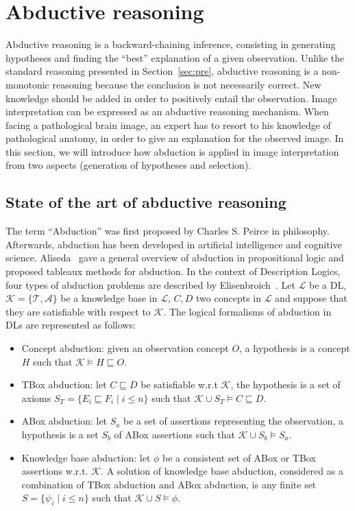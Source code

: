 \documentclass{article}
\begin{document}
\section{Abductive reasoning}\label{sec:abd}
Abductive reasoning is a backward-chaining inference, consisting in generating hypotheses and finding the ``best'' explanation of a given observation.
Unlike the standard reasoning presented in Section~\ref{sec:pre}, abductive reasoning is a non-monotonic reasoning because the conclusion is not necessarily correct.
New knowledge should be added in order to positively entail the observation.
Image interpretation can be expressed as an abductive reasoning  mechanism.
When facing a pathological brain image, an expert has to resort to his knowledge of pathological anatomy, in order to give  an explanation for the observed image. 
In this section, we will introduce how abduction is applied in image interpretation from two aspects (generation of hypotheses and selection).

\subsection{State of the art of abductive reasoning}
The term ``Abduction'' was first proposed by Charles S. Peirce in philosophy.
Afterwards, abduction has been developed in artificial intelligence and cognitive science.
Aliseda~\cite{aliseda1997seeking} gave a general overview of abduction in propositional logic and proposed tableaux methods for abduction.
In the context of Description Logics, four types of abduction problems  are described by Elisenbroich~\cite{elsenbroich2006case}.
Let $\mathcal{L}$ be a DL, $\mathcal{K}=\{\mathcal{T},\mathcal{A}\}$ be a knowledge base in $\mathcal{L}$, $C,D$ two concepts in $\mathcal{L}$ and suppose that they are satisfiable
with respect to  $\mathcal{K}$.
The logical formalisms of abduction in DLs are represented as follows:
\begin{itemize}
 \item Concept abduction: given an observation concept $O$, a hypothesis is a concept $H$ such that $\mathcal{K}\vDash H \sqsubseteq O$.
 \item TBox abduction: let $C\sqsubseteq D$ be satisfiable w.r.t $\mathcal{K}$, the hypothesis is a set of axioms $S_T=\{E_i\sqsubseteq F_i \mid i\leq n\}$
 such that $ \mathcal{K}\cup S_T\vDash C\sqsubseteq D$.
 \item ABox abduction: let $S_a$ be a set of assertions representing the observation, a hypothesis is a set $S_b$ of ABox assertions such that $\mathcal{K} \cup S_b\vDash S_a$.
 \item Knowledge base abduction: let $\phi$ be a consistent set of ABox or TBox assertions w.r.t. $\mathcal{K}$. A solution of knowledge base abduction, considered 
 as a combination of TBox abduction and ABox abduction, is any finite set $S=\{\psi_i \mid i\leq n\}$ such that $ \mathcal{K} \cup S \vDash \phi$.
\end{itemize}
\end{document}
